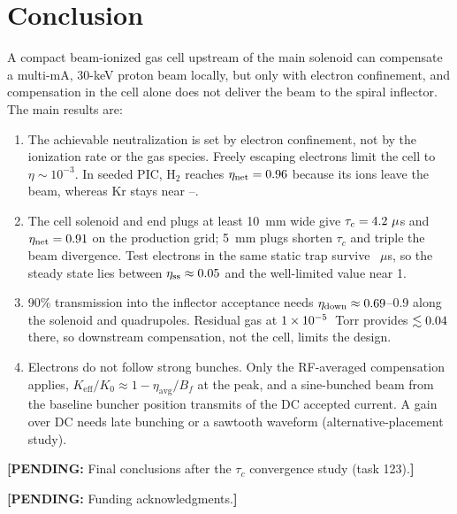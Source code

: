 \documentclass[aps,prab,10pt,twocolumn,superscriptaddress,showpacs,floatfix]{revtex4-2}
\newcommand{\pending}[1]{\textcolor{red!70!black}{\textbf{[PENDING:} #1\textbf{]}}}
\newcommand{\Keff}{K_{\mathrm{eff}}}
\newcommand{\etaavg}{\eta_{\mathrm{avg}}}
\newcommand{\Htwo}{\mathrm{H}_2}
\begin{document}
\section{Conclusion}
\label{sec:conclusion}

A compact beam-ionized gas cell upstream of the main solenoid can compensate a multi-mA,
30-keV proton beam locally, but only with electron confinement, and compensation in the cell
alone does not deliver the beam to the spiral inflector. The main results are:
\begin{enumerate}
\item The achievable neutralization is set by electron confinement, not by the ionization
rate or the gas species. Freely escaping electrons limit the cell to $\eta\sim10^{-3}$. In
seeded PIC, $\Htwo$ reaches $\eta_{\mathrm{net}}=0.96$ because its ions leave the
beam, whereas Kr stays near \numpicKreta{}--\numpicKretamax.
\item The cell solenoid and end plugs at least 10~mm wide give $\tau_c=4.2~\mu$s and
$\eta_{\mathrm{net}}=0.91$ on the production grid; 5~mm plugs shorten $\tau_c$ and
triple the beam divergence. Test electrons in the same static trap survive
\numstCtwotend~$\mu$s, so the steady state lies between $\eta_{\mathrm{ss}}\approx
0.05$ and the well-limited value near 1.
\item 90\% transmission into the inflector acceptance needs $\eta_{\mathrm{down}}\approx
0.69$--0.9 along the solenoid and quadrupoles. Residual gas at $1\times10^{-5}$~Torr
provides $\lesssim0.04$ there, so downstream compensation, not the cell, limits
the design.
\item Electrons do not follow strong bunches. Only the RF-averaged compensation applies,
$\Keff/K_0\approx1-\etaavg/B_f$ at the peak, and a sine-bunched beam from the baseline buncher
position transmits \numstBfiveGbasea{} of the DC accepted current. A gain over DC needs
late bunching or a sawtooth waveform (alternative-placement study).
\end{enumerate}
\pending{Final conclusions after the $\tau_c$ convergence study (task 123).}

\begin{acknowledgments}
\pending{Funding acknowledgments.}
\end{acknowledgments}

\appendix
\end{document}
